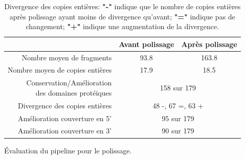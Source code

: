 \documentclass[10pt]{article}
\begin{document}
\begin{table}[h]
    \centering
    \begin{tabular}{r|c|c}
        \toprule 
         & \textbf{Avant polissage} & \textbf{Après polissage} \\
        \midrule
        Nombre moyen de fragments & 93.8 & 163.8 \\
        \rowcolor{gray!10}
        Nombre moyen de copies entières & 17.9 & 18.5 \\
        \makecell{Conservation/Amélioration \\ des domaines protéiques} & \multicolumn{2}{c}{158 sur 179} \\
        \rowcolor{gray!10}
        Divergence des copies entières & \multicolumn{2}{c}{48 -, 67 =, 63 +} \\
        Amélioration couverture en 5' & \multicolumn{2}{c}{95 sur 179} \\
        \rowcolor{gray!10}
        Amélioration couverture en 3' & \multicolumn{2}{c}{90 sur 179} \\
        \bottomrule
    \end{tabular}
    \caption{\'Evaluation du pipeline pour le polissage.}
    \caption*{
    \scriptsize{
    Divergence des copies entières: \textbf{"-"} indique que le nombre de copies entières après polissage ayant moins de divergence qu'avant; \textbf{"="} indique pas de changement; \textbf{"+"} indique une augmentation de la divergence.
    }
    }
    \label{tab:eval_poliste}
\end{table}

\bigskip
\end{document}
